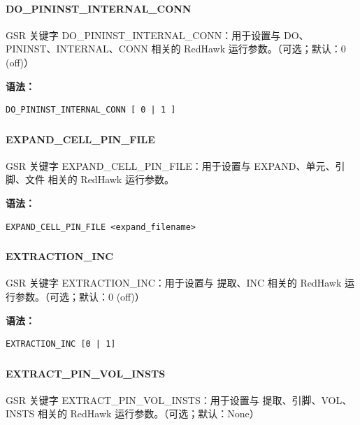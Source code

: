 \paragraph*{DO_PININST_INTERNAL_CONN}

GSR 关键字 DO_PININST_INTERNAL_CONN：用于设置与 DO、PININST、INTERNAL、CONN 相关的 RedHawk 运行参数。（可选；默认：0 (off)）

\textbf{语法：}
\begin{lstlisting}
DO_PININST_INTERNAL_CONN [ 0 | 1 ]
\end{lstlisting}

\subsubsection{}
\paragraph*{EXPAND_CELL_PIN_FILE}

GSR 关键字 EXPAND_CELL_PIN_FILE：用于设置与 EXPAND、单元、引脚、文件 相关的 RedHawk 运行参数。

\textbf{语法：}
\begin{lstlisting}
EXPAND_CELL_PIN_FILE <expand_filename>
\end{lstlisting}

\subsubsection{}
\paragraph*{EXTRACTION_INC}

GSR 关键字 EXTRACTION_INC：用于设置与 提取、INC 相关的 RedHawk 运行参数。（可选；默认：0 (off)）

\textbf{语法：}
\begin{lstlisting}
EXTRACTION_INC [0 | 1]
\end{lstlisting}

\subsubsection{}
\paragraph*{EXTRACT_PIN_VOL_INSTS}

GSR 关键字 EXTRACT_PIN_VOL_INSTS：用于设置与 提取、引脚、VOL、INSTS 相关的 RedHawk 运行参数。（可选；默认：None）


